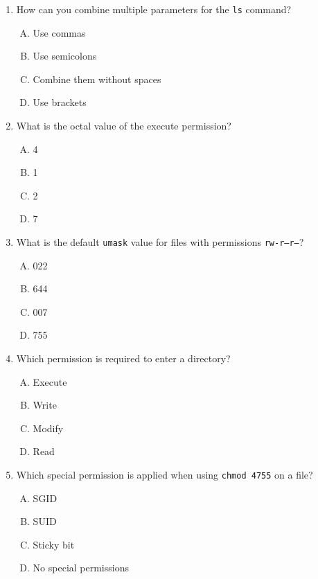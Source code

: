 \documentclass[a4paper]{report}
\begin{document}
\begin{enumerate}[1.]
    \item How can you combine multiple parameters for the \texttt{ls} command?  
    \begin{enumerate}[A)]
        \item Use commas  
        \item Use semicolons  
        \item Combine them without spaces  
        \item Use brackets  
    \end{enumerate}

    \item What is the octal value of the execute permission?  
    \begin{enumerate}[A)]
        \item 4  
        \item 1  
        \item 2  
        \item 7  
    \end{enumerate}

    \item What is the default \texttt{umask} value for files with permissions \texttt{rw-r--r--}?  
    \begin{enumerate}[A)]
        \item 022  
        \item 644  
        \item 007  
        \item 755  
    \end{enumerate}

    \item Which permission is required to enter a directory?  
    \begin{enumerate}[A)]
        \item Execute  
        \item Write  
        \item Modify  
        \item Read  
    \end{enumerate}

    \item Which special permission is applied when using \texttt{chmod 4755} on a file?  
    \begin{enumerate}[A)]
        \item SGID  
        \item SUID  
        \item Sticky bit  
        \item No special permissions  
    \end{enumerate}


\end{enumerate}
\end{document}
